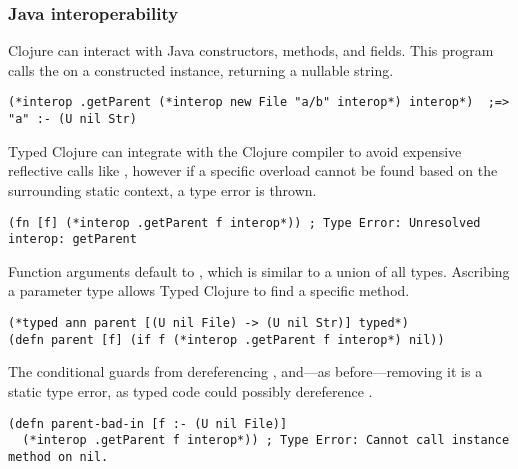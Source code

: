\subsubsection{Java interoperability}
\label{sec:overviewjavainterop}

Clojure can interact with Java constructors, methods, and fields.
This program calls the  on a constructed
instance, returning a nullable string.

\begin{exmp}
\begin{lstlisting}
(*interop .getParent (*interop new File "a/b" interop*) interop*)  ;=> "a" :- (U nil Str)
\end{lstlisting}
\label{example:getparent-direct-constructor}
\end{exmp}
%
Typed Clojure can integrate with the Clojure compiler to avoid expensive reflective 
calls like , however if a specific overload cannot be found based on the
surrounding static context, a type error is thrown.
%
\begin{lstlisting}
(fn [f] (*interop .getParent f interop*)) ; Type Error: Unresolved interop: getParent
\end{lstlisting}
%
Function arguments default to , which is similar to a union of all types. Ascribing
a parameter type allows Typed Clojure to find a specific method.


\begin{exmp}
\begin{lstlisting}
(*typed ann parent [(U nil File) -> (U nil Str)] typed*)
(defn parent [f] (if f (*interop .getParent f interop*) nil))
\end{lstlisting}
\label{example:parent-if}
\end{exmp}


The conditional guards from dereferencing , and---as before---removing 
it is a static type error, as typed code could possibly dereference .
\begin{lstlisting}
(defn parent-bad-in [f :- (U nil File)]
  (*interop .getParent f interop*)) ; Type Error: Cannot call instance method on nil.
\end{lstlisting}

